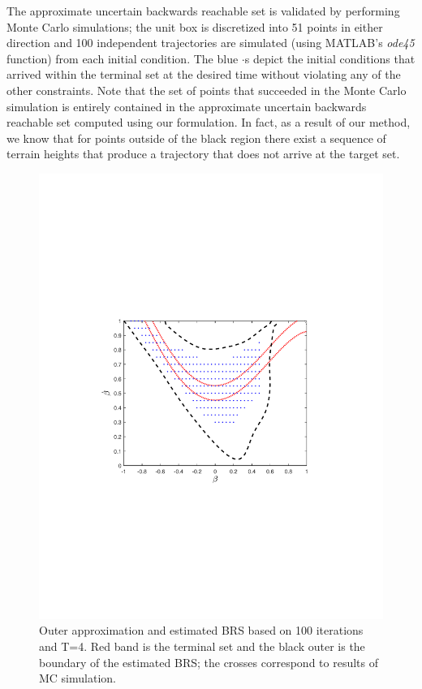 The approximate uncertain backwards reachable set is validated by performing Monte Carlo simulations; the unit box is discretized into 51 points in either direction and 100 independent trajectories are simulated (using MATLAB's {\em ode45} function) from each initial condition. 
The blue $\cdot$s depict the initial conditions that arrived within the terminal set at the desired time without violating any of the other constraints. 
Note that the set of points that succeeded in the Monte Carlo simulation is entirely contained in the approximate uncertain backwards reachable set computed using our formulation.
In fact, as a result of our method, we know that for points outside of the black region there exist a sequence of terrain heights that produce a trajectory that does not arrive at the target set.
\begin{figure}[!t]
  \includegraphics[trim=1.5in 3.3in 1.5in 3.5in, clip=true,width=\columnwidth]{figures/rw_0p1_4_new}
  \caption{Outer approximation and estimated BRS based on 100 iterations and T=4. Red band is the terminal set and the black outer is the boundary of the estimated BRS; the crosses correspond to results of MC simulation.}
  \label{fig:rw_brs}
\end{figure}

